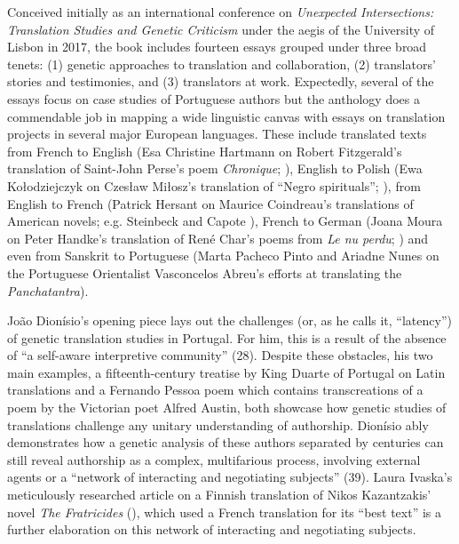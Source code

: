 \begin{review}
Conceived initially as an international conference on \emph{Unexpected
Intersections: Translation Studies and Genetic Criticism} under the
aegis of the University of Lisbon in 2017, the book includes fourteen
essays grouped under three broad tenets: (1) genetic approaches to
translation and collaboration, (2) translators' stories and testimonies,
and (3) translators at work. Expectedly, several of the essays focus on
case studies of Portuguese authors but the anthology does a commendable
job in mapping a wide linguistic canvas with essays on translation
projects in several major European languages. These include translated
texts from French to English (Esa Christine Hartmann on Robert
Fitzgerald's translation of Saint-John Perse's poem \emph{Chronique};
\citeyear{perse_chronique_1961}), English to Polish (Ewa Kołodziejczyk on Czesław Miłosz's
translation of ``Negro spirituals''; \cite{Miłosz_negro_1948,Miłosz_wiersze_1948}), from English to French
(Patrick Hersant on Maurice Coindreau's translations of American novels;
e.g. Steinbeck \citeyear{steinbeck_souris_1939} and Capote \citeyear{capote_harpe_1952}), French to German (Joana Moura on
Peter Handke's translation of René Char's poems from \emph{Le nu perdu};
) and even from Sanskrit to Portuguese (Marta Pacheco Pinto and
Ariadne Nunes on the Portuguese Orientalist Vasconcelos Abreu's efforts
at translating the \emph{Panchatantra}).

João Dionísio's opening piece lays out the challenges (or, as he calls
it, ``latency'') of genetic translation studies in Portugal. For him,
this is a result of the absence of ``a self-aware interpretive
community'' (28). Despite these obstacles, his two main examples, a
fifteenth-century treatise by King Duarte of Portugal on Latin
translations and a Fernando Pessoa poem which contains transcreations of
a poem by the Victorian poet Alfred Austin, both showcase how genetic
studies of translations challenge any unitary understanding of
authorship. Dionísio ably demonstrates how a genetic analysis of these
authors separated by centuries can still reveal authorship as a complex,
multifarious process, involving external agents or a ``network of
interacting and negotiating subjects'' (39). Laura Ivaska's meticulously
researched article on a Finnish translation of Nikos Kazantzakis' novel
\emph{The Fratricides} (\citeyear{kazantzakis_veljesviha_1967}), which used a French translation for its
``best text'' is a further elaboration on this network of interacting
and negotiating subjects.


\end{review}
